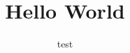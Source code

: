 \documentclass{article}
\author{test}
\begin{document}
\title{Hello World}
\maketitle
 


\end{document}
